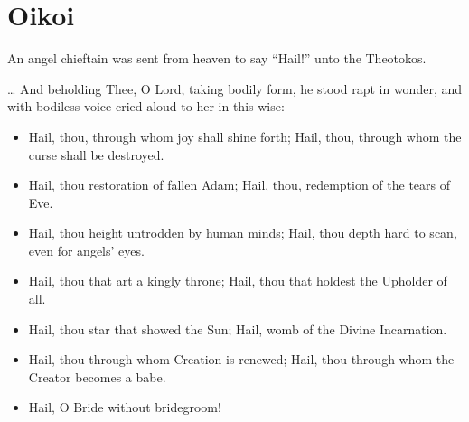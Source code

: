 \documentclass[twoside, letterpaper, 12pt]{report}
\begin{document}
\chapter*{Oikoi}


\begin{reader}
  \item An angel chieftain was sent from heaven to say 
    “Hail!” unto the Theotokos. \thrice{}
  \item … And beholding Thee, O Lord, taking bodily form,
    he stood rapt in wonder,
    and with bodiless voice cried aloud to her in this wise:
\end{reader}

\begin{itemize}[label=\tiny{+},leftmargin=*]
\item Hail, thou, through whom joy shall shine forth;
      Hail, thou, through whom the curse shall be destroyed.
\item Hail, thou restoration of fallen Adam;
      Hail, thou, redemption of the tears of Eve.
\item Hail, thou height untrodden by human minds;
      Hail, thou depth hard to scan, even for angels’ eyes.
\item Hail, thou that art a kingly throne;
      Hail, thou that holdest the Upholder of all.
\item Hail, thou star that showed the Sun;
      Hail, womb of the Divine Incarnation.
\item Hail, thou through whom Creation is renewed;
      Hail, thou through whom the Creator becomes
a babe.
\item Hail, O Bride without bridegroom!
\end{itemize}



\end{document}
